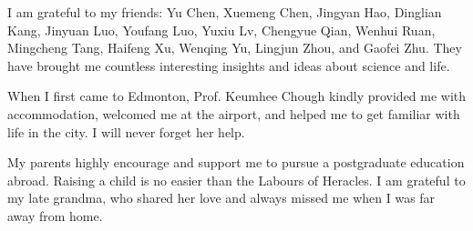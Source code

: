 I am grateful to my friends: Yu Chen, Xuemeng Chen, Jingyan Hao, Dinglian Kang, Jinyuan Luo, Youfang Luo, Yuxiu Lv, Chengyue Qian, Wenhui Ruan, Mingcheng Tang, Haifeng Xu, Wenqing Yu, Lingjun Zhou, and Gaofei Zhu. They have brought me countless interesting insights and ideas about science and life.

When I first came to Edmonton, Prof. Keumhee Chough kindly provided me with accommodation, welcomed me at the airport, and helped me to get familiar with life in the city. I will never forget her help.

My parents highly encourage and support me to pursue a postgraduate education abroad. Raising a child is no easier than the Labours of Heracles. I am grateful to my late grandma, who shared her love and always missed me when I was far away from home.